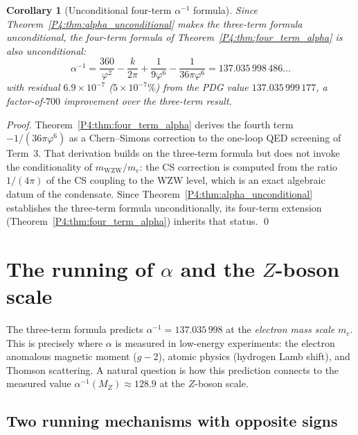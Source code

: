 \documentclass[11pt,a4paper]{article}
\newtheorem{corollary}[theorem]{Corollary}
\theoremstyle{definition}
\theoremstyle{remark}
\newcommand{\vp}{\varphi}
\newcommand{\aInv}{\alpha^{-1}}
\newcommand{\mWZW}{m_{\mathrm{WZW}}}
\begin{document}
\begin{corollary}[Unconditional four-term $\aInv$ formula]
\label{P4:cor:four_term_unconditional}
Since Theorem~\ref{P4:thm:alpha_unconditional} makes the three-term formula
unconditional, the four-term formula of Theorem~\ref{P4:thm:four_term_alpha}
is also unconditional:
\begin{equation}
  \boxed{
  \aInv
  = \frac{360}{\vp^2} - \frac{k}{2\pi}
  + \frac{1}{9\vp^6} - \frac{1}{36\pi\vp^6}
  = 137.035\,998\,486\ldots
  }
  \label{P4:eq:four_term_unconditional}
\end{equation}
with residual $6.9\times10^{-7}$ ($5\times10^{-7}\%$) from the PDG value
$137.035\,999\,177$, a factor-of-$700$ improvement over the three-term result.
\end{corollary}

\begin{proof}
Theorem~\ref{P4:thm:four_term_alpha} derives the fourth term
$-1/(36\pi\vp^6)$ as a Chern--Simons correction to the one-loop QED
screening of Term~3.
That derivation builds on the three-term formula but does not invoke
the conditionality of $\mWZW/m_e$: the CS correction is computed from
the ratio $1/(4\pi)$ of the CS coupling to the WZW level, which is
an exact algebraic datum of the condensate.
Since Theorem~\ref{P4:thm:alpha_unconditional} establishes the three-term
formula unconditionally, its four-term extension
(Theorem~\ref{P4:thm:four_term_alpha}) inherits that status.
\qed
\end{proof}

\section{The running of $\alpha$ and the $Z$-boson scale}
\label{P4:sec:alpha_running}

The three-term formula predicts $\aInv = 137.035\,998$ at the \emph{electron
mass scale} $m_e$.  This is precisely where $\alpha$ is measured in
low-energy experiments: the electron anomalous magnetic moment ($g-2$),
atomic physics (hydrogen Lamb shift), and Thomson scattering.  A natural
question is how this prediction connects to the measured value
$\aInv(M_Z) \approx 128.9$ at the $Z$-boson scale.

\subsection{Two running mechanisms with opposite signs}
\end{document}
